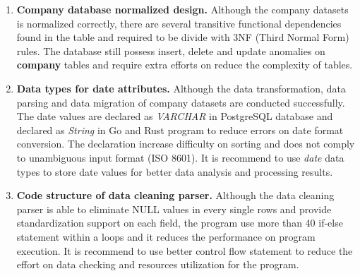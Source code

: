 \begin{enumerate}[topsep=0pt,itemsep=-1ex,partopsep=1ex,parsep=1.5ex]
	
	\item \textbf{Company database normalized design.} Although the company datasets is normalized correctly, there are several transitive functional dependencies found in the table and required to be divide with 3NF (Third Normal Form) rules. The database still possess insert, delete and update anomalies on \textbf{company} tables and require extra efforts on reduce the complexity of tables. 
	
	\item \textbf{Data types for date attributes.} Although the data transformation, data parsing and data migration of company datasets are conducted successfully. The date values are declared as \textit{VARCHAR} in PostgreSQL database and declared as \textit{String} in Go and Rust program to reduce errors on date format conversion. The declaration increase difficulty on sorting and does not comply to unambiguous input format (ISO 8601). It is recommend to use \textit{date} data types to store date values for better data analysis and processing results. 
	
	\item \textbf{Code structure of data cleaning parser.} Although the data cleaning parser is able to eliminate NULL values in every single rows and provide standardization support on each field, the program use more than 40 if-else statement within a loops and it reduces the performance on program execution. It is recommend to use better control flow statement to reduce the effort on data checking and resources utilization for the program. 
	
\end{enumerate}















